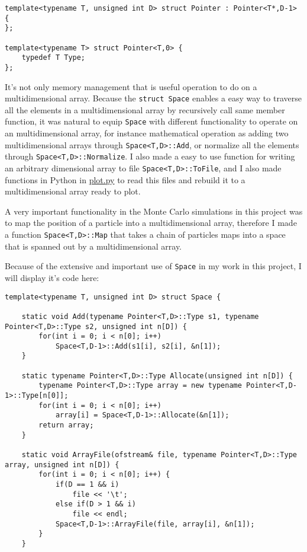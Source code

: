 \documentclass[11pt,english,a4paper]{article}
\begin{document}
\begin{flushleft}
\begin{lstlisting}[title={\texttt{struct Pointer}}]
template<typename T, unsigned int D> struct Pointer : Pointer<T*,D-1> {
};

template<typename T> struct Pointer<T,0> {
	typedef T Type;
};
\end{lstlisting} 

It's not only memory management that is useful operation to do on a multidimensional array. Because the \texttt{struct Space} enables a easy way to traverse all the elements in a multidimensional array by recursively call same member function, it was natural to equip \texttt{Space} with different functionality to operate on an multidimensional array, for instance mathematical operation as adding two multidimensional arrays through \texttt{Space<T,D>::Add}, or normalize all the elements through \texttt{Space<T,D>::Normalize}. I also made a easy to use function for writing an arbitrary dimensional array to file \texttt{Space<T,D>::ToFile}, and I also made functions in Python in \href{https://github.com/Eimund/UiO/blob/master/FYS4150/Project\%205/plot.py}{plot.py} to read this files and rebuild it to a multidimensional array ready to plot. \linebreak

A very important functionality in the Monte Carlo simulations in this project was to map the position of a particle into a multidimensional array, therefore I made a function \texttt{Space<T,D>::Map} that takes a chain of particles maps into a space that is spanned out by a multidimensional array. \linebreak

Because of the extensive and important use of \texttt{Space} in my work in this project, I will display it's code here:

\begin{lstlisting}[title={\texttt{struct Space}}]
template<typename T, unsigned int D> struct Space {

	static void Add(typename Pointer<T,D>::Type s1, typename Pointer<T,D>::Type s2, unsigned int n[D]) {
		for(int i = 0; i < n[0]; i++)
			Space<T,D-1>::Add(s1[i], s2[i], &n[1]);
	}
	
	static typename Pointer<T,D>::Type Allocate(unsigned int n[D]) {
		typename Pointer<T,D>::Type array = new typename Pointer<T,D-1>::Type[n[0]];
		for(int i = 0; i < n[0]; i++)
			array[i] = Space<T,D-1>::Allocate(&n[1]);
		return array;
	}
	
	static void ArrayFile(ofstream& file, typename Pointer<T,D>::Type array, unsigned int n[D]) {
		for(int i = 0; i < n[0]; i++) {
			if(D == 1 && i)
				file << '\t';
			else if(D > 1 && i)
				file << endl;
			Space<T,D-1>::ArrayFile(file, array[i], &n[1]);
		}
	}
	

\end{lstlisting}
\end{flushleft}
\end{document}
